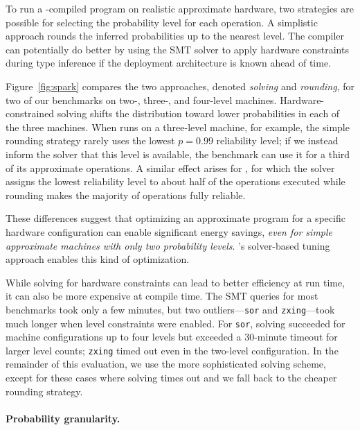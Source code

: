 \documentclass[10pt,nocopyrightspace,preprint]{sigplanconf}
\newcommand{\code}{\lstinline[emphstyle={},keywordstyle={}]}
\begin{document}
To run a \lang-compiled program on realistic approximate hardware, two
strategies are possible for selecting the probability level for each operation.
A simplistic approach rounds the inferred probabilities up to the nearest
level.
The compiler can potentially do better by using the SMT solver to apply hardware
constraints during type inference if the deployment architecture is known
ahead of time.

Figure~\ref{fig:spark} compares the two approaches, denoted \emph{solving} and
\emph{rounding},
for two of
our benchmarks on \mbox{two-,} \mbox{three-,} and four-level machines.
Hardware-constrained solving shifts the distribution toward lower
probabilities in each of the three machines.
When  runs on a three-level machine, for example, the simple
rounding strategy rarely uses the lowest $p=0.99$ reliability level;
if we instead inform the solver that this level is available, the benchmark
can use it for a third of its approximate operations.
A similar effect arises for , for which the solver assigns the
lowest reliability level to about half of the operations executed while
rounding makes the majority of operations fully reliable.

These differences suggest that optimizing an approximate program for a
specific hardware configuration can enable significant energy savings,
\emph{even for simple approximate machines with only two probability levels}.
\lang's solver-based tuning approach enables this kind of
optimization.

While solving for hardware constraints can lead to better efficiency at run
time, it can also be more expensive at compile time.
The SMT queries for most benchmarks took only a few minutes,
but two outliers---\code{sor} and \code{zxing}---took much longer when level constraints
were enabled.
For \code{sor}, solving succeeded for machine configurations up to four levels
but exceeded a 30-minute timeout for larger level counts;
\code{zxing} timed out even in the two-level configuration.
In the remainder of this evaluation, we use the more sophisticated solving
scheme, except for these cases where solving times out and we fall back to the
cheaper rounding strategy.


\paragraph{Probability granularity.}
\end{document}
